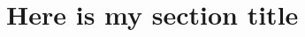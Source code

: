 \documentclass{article}
\begin{document}
\section{Here is my section title}
\lipsum[1]
\end{document}
